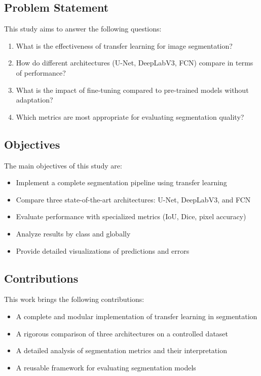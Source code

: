 \documentclass[12pt,a4paper]{article}
\begin{document}
\subsection{Problem Statement}

This study aims to answer the following questions:
\begin{enumerate}
    \item What is the effectiveness of transfer learning for image segmentation?
    \item How do different architectures (U-Net, DeepLabV3, FCN) compare in terms of performance?
    \item What is the impact of fine-tuning compared to pre-trained models without adaptation?
    \item Which metrics are most appropriate for evaluating segmentation quality?
\end{enumerate}

\subsection{Objectives}

The main objectives of this study are:
\begin{itemize}
    \item Implement a complete segmentation pipeline using transfer learning
    \item Compare three state-of-the-art architectures: U-Net, DeepLabV3, and FCN
    \item Evaluate performance with specialized metrics (IoU, Dice, pixel accuracy)
    \item Analyze results by class and globally
    \item Provide detailed visualizations of predictions and errors
\end{itemize}

\subsection{Contributions}

This work brings the following contributions:
\begin{itemize}
    \item A complete and modular implementation of transfer learning in segmentation
    \item A rigorous comparison of three architectures on a controlled dataset
    \item A detailed analysis of segmentation metrics and their interpretation
    \item A reusable framework for evaluating segmentation models
\end{itemize}
\end{document}
